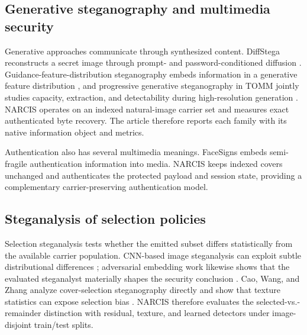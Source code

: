 \subsection{Generative steganography and multimedia security}

Generative approaches communicate through synthesized content. DiffStega reconstructs a secret image through prompt- and password-conditioned diffusion \cite{yang2024diffstega}. Guidance-feature-distribution steganography embeds information in a generative feature distribution \cite{sun2024guidance}, and progressive generative steganography in TOMM jointly studies capacity, extraction, and detectability during high-resolution generation \cite{zhou2025pgs}. NARCIS operates on an indexed natural-image carrier set and measures exact authenticated byte recovery. The article therefore reports each family with its native information object and metrics.

Authentication also has several multimedia meanings. FaceSigns \cite{neekhara2024facesigns} embeds semi-fragile authentication information into media. NARCIS keeps indexed covers unchanged and authenticates the protected payload and session state, providing a complementary carrier-preserving authentication model.

\subsection{Steganalysis of selection policies}

Selection steganalysis tests whether the emitted subset differs statistically from the available carrier population. CNN-based image steganalysis can exploit subtle distributional differences \cite{li2023siairnet}; adversarial embedding work likewise shows that the evaluated steganalyst materially shapes the security conclusion \cite{wang2024adversarial}. Cao, Wang, and Zhang analyze cover-selection steganography directly and show that texture statistics can expose selection bias \cite{cao2025glcm}. NARCIS therefore evaluates the selected-vs.-remainder distinction with residual, texture, and learned detectors under image-disjoint train/test splits.

